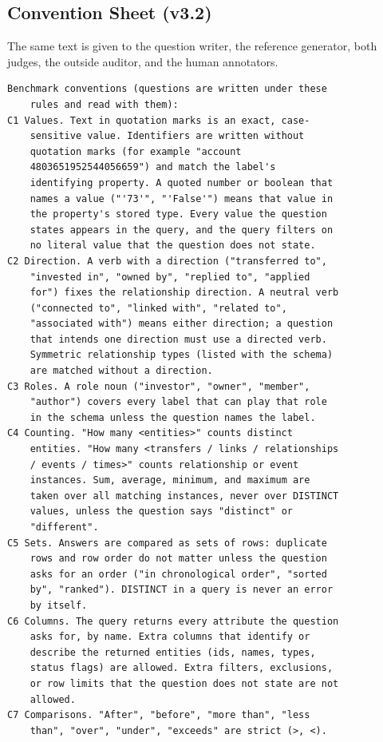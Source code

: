 \subsection{Convention Sheet (v3.2)}
The same text is given to the question writer, the reference generator, both judges, the outside auditor, and the human annotators.
\par\smallskip
\begingroup
\fontsize{6.3}{7.3}\selectfont
\begin{verbatim}
Benchmark conventions (questions are written under these
    rules and read with them):
C1 Values. Text in quotation marks is an exact, case-
    sensitive value. Identifiers are written without
    quotation marks (for example "account
    4803651952544056659") and match the label's
    identifying property. A quoted number or boolean that
    names a value ("'73'", "'False'") means that value in
    the property's stored type. Every value the question
    states appears in the query, and the query filters on
    no literal value that the question does not state.
C2 Direction. A verb with a direction ("transferred to",
    "invested in", "owned by", "replied to", "applied
    for") fixes the relationship direction. A neutral verb
    ("connected to", "linked with", "related to",
    "associated with") means either direction; a question
    that intends one direction must use a directed verb.
    Symmetric relationship types (listed with the schema)
    are matched without a direction.
C3 Roles. A role noun ("investor", "owner", "member",
    "author") covers every label that can play that role
    in the schema unless the question names the label.
C4 Counting. "How many <entities>" counts distinct
    entities. "How many <transfers / links / relationships
    / events / times>" counts relationship or event
    instances. Sum, average, minimum, and maximum are
    taken over all matching instances, never over DISTINCT
    values, unless the question says "distinct" or
    "different".
C5 Sets. Answers are compared as sets of rows: duplicate
    rows and row order do not matter unless the question
    asks for an order ("in chronological order", "sorted
    by", "ranked"). DISTINCT in a query is never an error
    by itself.
C6 Columns. The query returns every attribute the question
    asks for, by name. Extra columns that identify or
    describe the returned entities (ids, names, types,
    status flags) are allowed. Extra filters, exclusions,
    or row limits that the question does not state are not
    allowed.
C7 Comparisons. "After", "before", "more than", "less
    than", "over", "under", "exceeds" are strict (>, <).

\end{verbatim}
